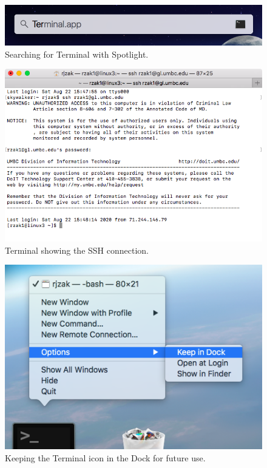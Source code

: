\documentclass[letter,11pt]{article}
\begin{document}
\begin{figure}
\centering
\includegraphics[scale=0.6]{Images/spotlight_terminal.png}
\caption{Searching for Terminal with Spotlight.}
\label{fig:macspotlightterminal}
\end{figure}

\begin{figure}
\centering
\includegraphics[scale=0.6]{Images/macos_terminal_ssh.png}
\caption{Terminal showing the SSH connection.}
\label{fig:macterminalconnected}
\end{figure}

\begin{figure}
\centering
\includegraphics[scale=0.6]{Images/terminal_keep_in_dock.png}
\caption{Keeping the Terminal icon in the Dock for future use.}
\label{fig:macterminaldock}
\end{figure}
\end{document}
